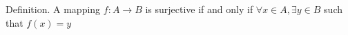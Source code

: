 \documentclass[preview]{standalone}
\begin{document}
\begin{center}
Definition. A mapping $f : A \to B$ is surjective if and only if $\forall x \in A, \exists y \in B$ such that $f(x) = y$
\end{center}
\end{document}
